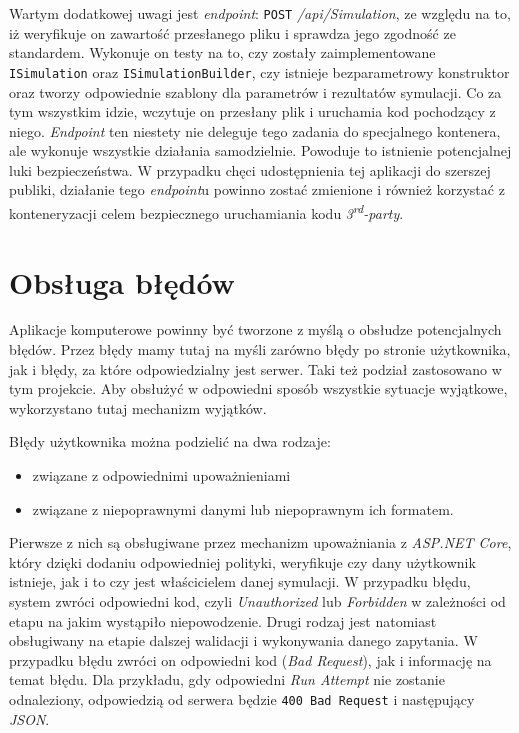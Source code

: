 \par Wartym dodatkowej uwagi jest \emph{endpoint}: \texttt{POST} \emph{/api/Simulation}, ze względu na to, iż weryfikuje on zawartość przesłanego pliku i sprawdza jego zgodność ze standardem. Wykonuje on testy na to, czy zostały zaimplementowane \texttt{ISimulation} oraz \texttt{ISimulationBuilder}, czy istnieje bezparametrowy konstruktor oraz tworzy odpowiednie szablony dla parametrów i rezultatów symulacji. Co za tym wszystkim idzie, wczytuje on przesłany plik i uruchamia kod pochodzący z niego. \emph{Endpoint} ten niestety nie deleguje tego zadania do specjalnego kontenera, ale wykonuje wszystkie działania samodzielnie. Powoduje to istnienie potencjalnej luki bezpieczeństwa. W przypadku chęci udostępnienia tej aplikacji do szerszej publiki, działanie tego \emph{endpoint}u powinno zostać zmienione i również korzystać z konteneryzacji celem bezpiecznego uruchamiania kodu \emph{3\textsuperscript{rd}-party}.

\section{Obsługa błędów}

\par Aplikacje komputerowe powinny być tworzone z myślą o obsłudze potencjalnych błędów. Przez błędy mamy tutaj na myśli zarówno błędy po stronie użytkownika, jak i błędy, za które odpowiedzialny jest serwer. Taki też podział zastosowano w tym projekcie. Aby obsłużyć w odpowiedni sposób wszystkie sytuacje wyjątkowe, wykorzystano tutaj mechanizm wyjątków.

\par Błędy użytkownika można podzielić na dwa rodzaje:
\begin{itemize}
	\item związane z odpowiednimi upoważnieniami
	\item związane z niepoprawnymi danymi lub niepoprawnym ich formatem.
\end{itemize}
Pierwsze z nich są obsługiwane przez mechanizm upoważniania z \emph{ASP.NET Core}, który dzięki dodaniu odpowiedniej polityki, weryfikuje czy dany użytkownik istnieje, jak i to czy jest właścicielem danej symulacji. W przypadku błędu, system zwróci odpowiedni kod, czyli \emph{Unauthorized} lub \emph{Forbidden} w zależności od etapu na jakim wystąpiło niepowodzenie. Drugi rodzaj jest natomiast obsługiwany na etapie dalszej walidacji i wykonywania danego zapytania. W przypadku błędu zwróci on odpowiedni kod (\emph{Bad Request}), jak i informację na temat błędu. Dla przykładu, gdy odpowiedni \emph{Run Attempt} nie zostanie odnaleziony, odpowiedzią od serwera będzie \texttt{400 Bad Request} i następujący \emph{JSON}.

